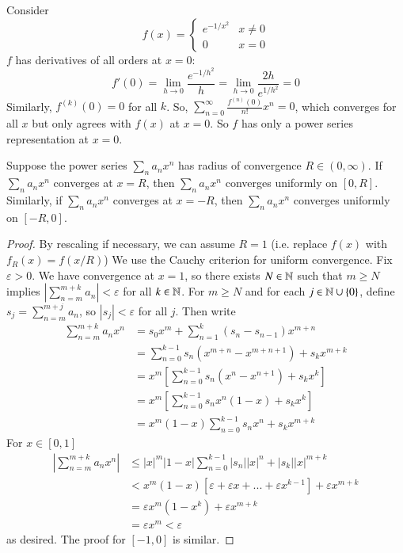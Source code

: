 \begin{example}
    Consider $$f(x) = \left\{\begin{array}{cc} e^{-1/x^2} & x \neq 0 \\ 0 & x =0\end{array}\right.$$ $f$ has derivatives of all orders at $x = 0$: $$f'(0) = \lim\limits_{h\rightarrow 0}\frac{e^{-1/h^2}}{h} = \lim\limits_{h\rightarrow 0}\frac{2h}{e^{1/h^2}} = 0$$ Similarly, $f^{(k)}(0) = 0$ for all $k$. So, $\sum_{n=0}^{\infty}\frac{f^{(n)}(0)}{n!}x^n = 0$, which converges for all $x$ but only agrees with $f(x)$ at $x = 0$. So $f$ has only a power series representation at $x = 0$.
\end{example}

\begin{theorem}
    Suppose the power series $\sum_na_nx^n$ has radius of convergence $R \in (0,\infty)$. If $\sum_na_nx^n$ converges at $x = R$, then $\sum_na_nx^n$ converges uniformly on $[0,R]$. Similarly, if $\sum_na_nx^n$ converges at $x = -R$, then $\sum_na_nx^n$ converges uniformly on $[-R,0]$.
\end{theorem}
\begin{proof}
    By rescaling if necessary, we can assume $R = 1$ (i.e. replace $f(x)$ with $f_R(x) = f(x/R)$) We use the Cauchy criterion for uniform convergence. Fix $\varepsilon > 0$. We have convergence at $x = 1$, so there exists $N \in \mathbb N$ such that $m \geq N$ implies $\left|\sum_{n=m}^{m+k}a_n\right| < \varepsilon$ for all $k \in \mathbb N$. For $m \geq N$ and for each $j \in \mathbb N\cup\{0\}$, define $s_j = \sum_{n=m}^{m+j}a_n$, so $|s_j| < \varepsilon$ for all $j$. Then write \begin{align*}
        \sum_{n=m}^{m+k}a_nx^n &= s_0x^m + \sum_{n=1}^k(s_n-s_{n-1})x^{m+n} \\
        &= \sum_{n=0}^{k-1}s_n(x^{m+n}-x^{m+n+1}) + s_kx^{m+k} \\
        &= x^m\left[ \sum_{n=0}^{k-1}s_n(x^{n}-x^{n+1}) + s_kx^{k}\right] \\
        &=x^m\left[ \sum_{n=0}^{k-1}s_nx^n(1-x) + s_kx^{k}\right] \\
        &= x^m(1-x)\sum_{n=0}^{k-1}s_nx^n + s_kx^{m+k}
    \end{align*}
    For $x \in [0,1]$ \begin{align*}
        \left|\sum_{n=m}^{m+k}a_nx^n\right| &\leq |x|^m|1-x|\sum_{n=0}^{k-1}|s_n||x|^n + |s_k||x|^{m+k} \\
        &< x^m(1-x)[\varepsilon+\varepsilon x+...+\varepsilon x^{k-1}] + \varepsilon x^{m+k} \\
        &= \varepsilon x^m(1-x^k) + \varepsilon x^{m+k} \\
        &= \varepsilon x^m < \varepsilon
    \end{align*}
    as desired. The proof for $[-1,0]$ is similar.
\end{proof}


